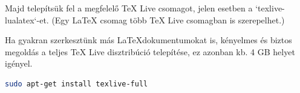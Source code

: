Majd telepítsük fel a megfelelő TeX Live csomagot, jelen esetben a `texlive-lualatex`-et. (Egy LaTeX csomag több TeX Live csomagban is szerepelhet.)

Ha gyakran szerkesztünk más \LaTeX dokumentumokat is, kényelmes és biztos megoldás a teljes TeX Live disztribúció telepítése, ez azonban kb. 4 GB helyet igényel.

\begin{lstlisting}[language=bash,morekeywords={sudo,apt\-get},alsoletter={-},breaklines=true]
sudo apt-get install texlive-full
\end{lstlisting}
